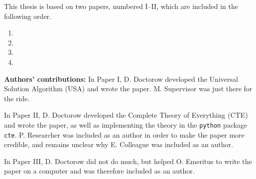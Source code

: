 This thesis is based on two papers, numbered I--II, which are included
in the following order.

\begin{enumerate}[label=\Roman*.]
   \item {}
   
   \item {}

   \item {}
   
   \item {}

\end{enumerate}

\textbf{Authors' contributions:}
In Paper I, D. Doctorow developed the Universal Solution Algorithm (USA) and wrote the paper.
M. Supervisor was just there for the ride.

In Paper II, D. Doctorow developed the Complete Theory of Everything (CTE) and wrote the paper, as well
as implementing the theory in the \texttt{python} package \texttt{cte}.
P. Researcher was included as an author in order to make the paper more credible, and remains
unclear why E. Colleague was included as an author.

In Paper III, D. Doctorow did not do much, but helped O. Emeritus to write the paper on a computer and was therefore
included as an author.
